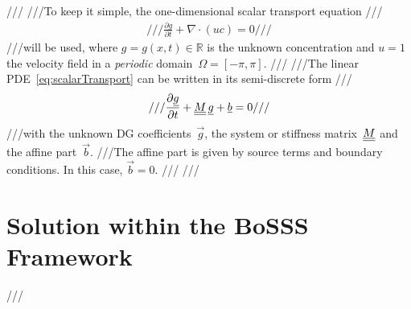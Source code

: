 {///\label{sec:scalarConvection_problem}
///To keep it simple, the one-dimensional scalar transport equation
///\begin{align} \label{eq:scalarTransport}
///\frac{\partial g}{\partial t} + \nabla \cdot \left(uc\right) = 0
///\end{align}
///will be used, where $g=g(x,t) \in \mathbb{R}$ is the unknown concentration and $u=1$ the velocity field in a \emph{periodic} domain~$\Omega = \left[-\pi,\pi\right]$.
///
///The linear PDE~\eqref{eq:scalarTransport} can be written in its semi-discrete form
///\begin{align} \label{eq:semiDiscreteForm}
///\frac{\partial \vec g}{\partial t} + \matrix{M} \, \vec g + \vec b = 0
///\end{align}
///with the unknown DG coefficients~$\vec g$, the system or stiffness matrix~$\underline{\underline{M}}$ and the affine part~$\vec b$. 
///The affine part is given by source terms and boundary conditions. In this case, $\vec b = 0$.
///
///\section{Solution within the BoSSS Framework}
///\label{sec:scalarConvection_tutorial}
 }
\BoSSSexe
{}
\BoSSSexeSilent
{}
\BoSSSexe
{}
\BoSSSexe
{}
\BoSSSexe
{}
\BoSSSexe
